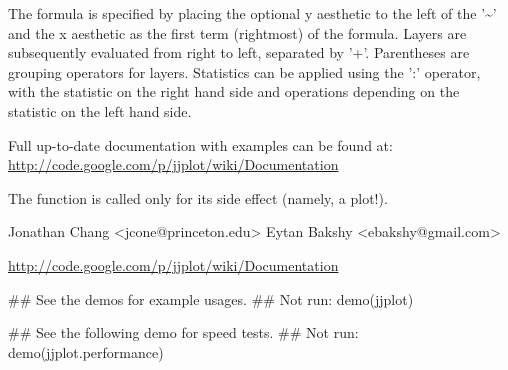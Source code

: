 \begin{Details}\relax
The formula is specified by placing the optional y aesthetic to the
left of the '\textasciitilde{}' and the x aesthetic as 
the first term (rightmost) of the formula.  Layers are subsequently
evaluated from right to left, separated by '+'.  Parentheses are
grouping operators for layers.  Statistics can be applied using the
':' operator, with the statistic on the right hand side and operations
depending on the statistic on the left hand side.

Full up-to-date documentation with examples can be found at:
\url{http://code.google.com/p/jjplot/wiki/Documentation}
\end{Details}
\begin{Value}
The function is called only for its side effect (namely, a plot!).
\end{Value}
\begin{Author}\relax
Jonathan Chang \textless{}jcone@princeton.edu\textgreater{}
Eytan Bakshy \textless{}ebakshy@gmail.com\textgreater{}
\end{Author}
\begin{References}\relax
\url{http://code.google.com/p/jjplot/wiki/Documentation}
\end{References}
\begin{Examples}
\begin{ExampleCode}
 ## See the demos for example usages.
 ## Not run: demo(jjplot)

 ## See the following demo for speed tests.
 ## Not run: demo(jjplot.performance)
\end{ExampleCode}
\end{Examples}

